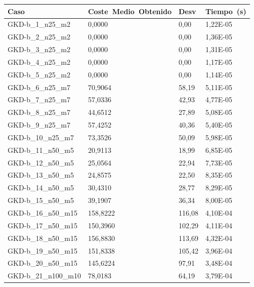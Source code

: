 \pagebreak

\begin{table}[!ht]%
    \centering    
    \begin{adjustbox}{height=12cm}
    \begin{tabular}{|l|l|l|l|}
    \hline
        Caso & Coste~Medio~Obtenido & Desv & Tiempo~(s) \\ \hline
        GKD-b\_1\_n25\_m2 & 0,0000 & 0,00 & 1,22E-05 \\ \hline
        GKD-b\_2\_n25\_m2 & 0,0000 & 0,00 & 1,36E-05 \\ \hline
        GKD-b\_3\_n25\_m2 & 0,0000 & 0,00 & 1,31E-05 \\ \hline
        GKD-b\_4\_n25\_m2 & 0,0000 & 0,00 & 1,17E-05 \\ \hline
        GKD-b\_5\_n25\_m2 & 0,0000 & 0,00 & 1,14E-05 \\ \hline
        GKD-b\_6\_n25\_m7 & 70,9064 & 58,19 & 5,11E-05 \\ \hline
        GKD-b\_7\_n25\_m7 & 57,0336 & 42,93 & 4,77E-05 \\ \hline
        GKD-b\_8\_n25\_m7 & 44,6512 & 27,89 & 5,08E-05 \\ \hline
        GKD-b\_9\_n25\_m7 & 57,4252 & 40,36 & 5,40E-05 \\ \hline
        GKD-b\_10\_n25\_m7 & 73,3526 & 50,09 & 5,98E-05 \\ \hline
        GKD-b\_11\_n50\_m5 & 20,9113 & 18,99 & 6,85E-05 \\ \hline
        GKD-b\_12\_n50\_m5 & 25,0564 & 22,94 & 7,73E-05 \\ \hline
        GKD-b\_13\_n50\_m5 & 24,8575 & 22,50 & 8,35E-05 \\ \hline
        GKD-b\_14\_n50\_m5 & 30,4310 & 28,77 & 8,29E-05 \\ \hline
        GKD-b\_15\_n50\_m5 & 39,1907 & 36,34 & 8,00E-05 \\ \hline
        GKD-b\_16\_n50\_m15 & 158,8222 & 116,08 & 4,10E-04 \\ \hline
        GKD-b\_17\_n50\_m15 & 150,3960 & 102,29 & 4,11E-04 \\ \hline
        GKD-b\_18\_n50\_m15 & 156,8830 & 113,69 & 4,32E-04 \\ \hline
        GKD-b\_19\_n50\_m15 & 151,8338 & 105,42 & 3,96E-04 \\ \hline
        GKD-b\_20\_n50\_m15 & 145,6224 & 97,91 & 3,48E-04 \\ \hline
        GKD-b\_21\_n100\_m10 & 78,0183 & 64,19 & 3,79E-04 \\ \hline

\end{tabular}
\end{adjustbox}
\end{table}
